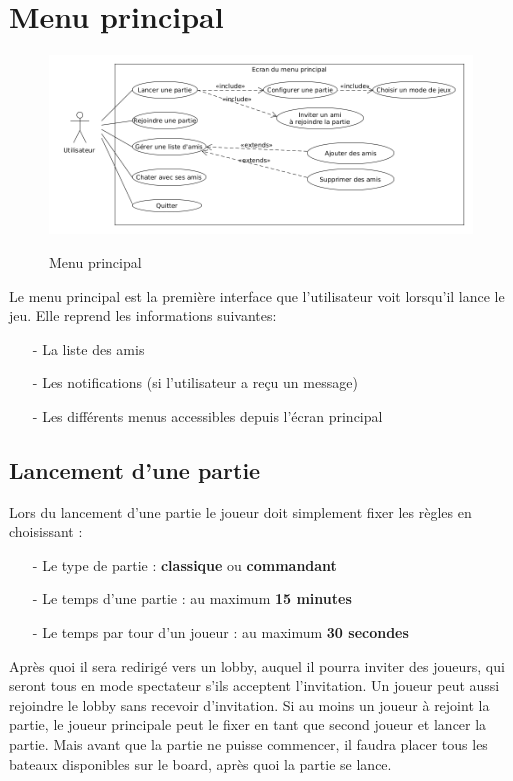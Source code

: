 \documentclass[../besoin_user.tex]{subfiles}
\begin{document}
\section{Menu principal}
\begin{figure}[h]
    \centering
    \includegraphics[scale=0.5]{img_fonctionnel/use_case_user_ecran_principal.png}
    \label{fig:user_menu_principal}
    \caption{Menu principal}
\end{figure}

Le menu principal est la première interface que l'utilisateur voit lorsqu'il lance le jeu.
Elle reprend les informations suivantes:
\begin{itemize}
    \item[-] La liste des amis
    \item[-] Les notifications (si l'utilisateur a reçu un message)
    \item[-] Les différents menus accessibles depuis l'écran principal 
\end{itemize}

\subsection{Lancement d'une partie}
Lors du lancement d'une partie le joueur doit simplement fixer les règles en choisissant :
\begin{itemize}
	\item[-] Le type de partie : \textbf{classique} ou \textbf{commandant}
	\item[-] Le temps d'une partie : au maximum \textbf{15 minutes}
	\item[-] Le temps par tour d'un joueur : au maximum \textbf{30 secondes}
\end{itemize}

Après quoi il sera redirigé vers un lobby, auquel il pourra inviter des joueurs, qui seront tous en mode spectateur s'ils acceptent l'invitation.
Un joueur peut aussi rejoindre le lobby sans recevoir d'invitation.
Si au moins un joueur à rejoint la partie, le joueur principale peut le fixer en tant que second joueur et lancer la partie.
Mais avant que la partie ne puisse commencer, il faudra placer tous les bateaux disponibles sur le board, après quoi la partie se lance.
\end{document}
